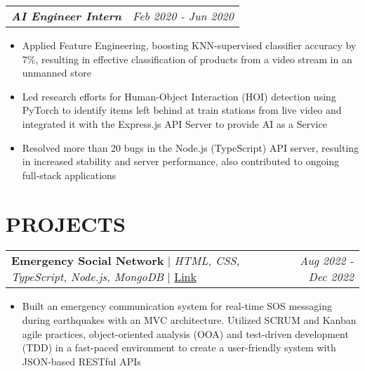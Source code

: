 \documentclass[letterpaper]{article}
\makeatletter
\newcommand{\resumeItemWithoutTitle}[1]{
  \item{
    {#1 \vspace{-4pt}}
  }
}
\newcommand{\resumeSubheadingWithoutTitle}[2]{
  \begin{tabular*}{\textwidth}{l@{\extracolsep{\fill}}r}
        \textbf{\textit{#1}} & \textit{ #2} \\
    \end{tabular*}\vspace{-15pt}
}
\newcommand{\shortSection}[1]{
    \vspace{-6pt}
    \section{#1}
}
\newcommand{\projectHeading}[4]{
  \begin{tabular*}{\textwidth}{l@{\extracolsep{\fill}}r}
        \textbf{#1} 
        \hspace{-2pt} $\vert$ \hspace{-2pt} {\textit{#2}} 
        \hspace{-2pt} $\vert$ \hspace{-2pt} \href{#3}{ \underline{Link}}
        &
        \textit{#4} \\
    \end{tabular*}\vspace{-2pt}
}
\newcommand{\resumeItemListStart}{\begin{itemize}}
\newcommand{\resumeItemListEnd}{\end{itemize}}
\makeatother
\begin{document}
\vspace{2pt}
\resumeSubheadingWithoutTitle
{AI Engineer Intern}{Feb 2020 - Jun 2020}
\vspace{0pt}
\resumeItemListStart
\resumeItemWithoutTitle{Applied Feature Engineering, boosting KNN-supervised classifier accuracy by 7\%, resulting in effective classification of products from a video stream in an unmanned store}
\resumeItemWithoutTitle{Led research efforts for Human-Object Interaction (HOI) detection using PyTorch to identify items left behind at train stations from live video and integrated it with the Express.js API Server to provide AI as a Service}
\resumeItemWithoutTitle{Resolved more than 20 bugs in the Node.js (TypeScript) API server, resulting in increased stability and server performance, also contributed to ongoing full-stack applications}
\resumeItemListEnd


\shortSection{PROJECTS}




\vspace{3pt}
\projectHeading {Emergency Social Network}{HTML, CSS, TypeScript, Node.js, MongoDB}{https://esn.onrender.com}{Aug 2022 - Dec 2022}
\resumeItemListStart
\resumeItemWithoutTitle{Built an emergency communication system for real-time SOS messaging during earthquakes with an MVC architecture. Utilized SCRUM and Kanban agile practices, object-oriented analysis (OOA) and test-driven development (TDD) in a fast-paced environment to create a user-friendly system with JSON-based RESTful APIs}
\resumeItemListEnd
\end{document}
